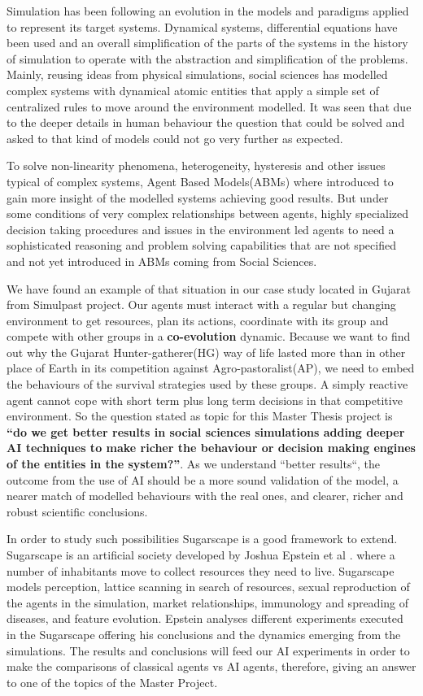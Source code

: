 \documentclass[11pt,oneside,a4paper,openright]{report}
\begin{document}
Simulation has been following an evolution in the models and paradigms applied to represent its target
systems. Dynamical systems, differential equations have been used and an overall simplification of the parts of the systems in the history of simulation to operate with the abstraction and simplification of the problems.
Mainly, reusing ideas from physical simulations, social sciences has modelled complex systems with dynamical
atomic entities that apply a simple set of centralized rules to move around the environment modelled. It was seen that due to the deeper details in human behaviour the question that could be solved and asked to that kind of models could not go very further as expected.

To solve non-linearity phenomena, heterogeneity, hysteresis\cite[p.571–597]{hysteresisDef} and other issues typical of complex systems, Agent Based Models(ABMs) where introduced to gain more insight of the modelled systems achieving good results. But under 
some conditions of very complex relationships between agents, highly specialized decision taking procedures
and issues in the environment led agents to need a sophisticated reasoning and problem solving capabilities
that are not specified and not yet introduced in ABMs coming from Social Sciences.

We have found an example of that situation in our case study located in Gujarat from Simulpast project. Our agents must interact with a regular but changing environment to get resources, plan its actions, coordinate with its group and compete with other groups in a \textbf{co-evolution} dynamic. Because we want to find out why the Gujarat Hunter-gatherer(HG) way of life lasted more than in other place of Earth in its competition against Agro-pastoralist(AP), we need to embed the behaviours of the survival strategies used by these groups. A simply reactive agent cannot cope with short term plus long term decisions in that competitive environment. So the question stated as topic for this Master Thesis project is \textbf{``do we get better results in social sciences simulations adding deeper AI techniques to make richer the behaviour or decision making engines of the entities in the system?''}. As we understand ``better results``, the outcome from the use of AI should be a more sound validation of the model, a nearer match of modelled behaviours with the real ones, and clearer, richer and robust scientific conclusions.

In order to study such possibilities Sugarscape is a good framework to extend. Sugarscape is an artificial society developed by Joshua Epstein et al \cite{EpsteinAxtell}. where a number of inhabitants move to collect resources they need to live. Sugarscape models perception, lattice scanning in search of resources, sexual reproduction of the agents in the simulation, market relationships, immunology and spreading of diseases, and feature evolution. Epstein analyses different experiments executed in the Sugarscape offering his conclusions and the dynamics emerging from the simulations. The results and conclusions will feed our AI experiments in order to make the comparisons of classical  agents vs AI agents, therefore, giving an answer to one of the topics of the Master Project.
\end{document}
